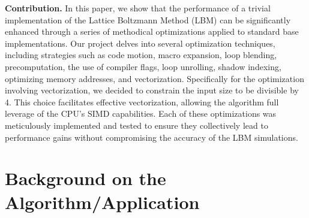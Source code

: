 \documentclass[letterpaper]{article}
\newcommand{\mypar}[1]{{\bf #1.}}
\begin{document}
\mypar{Contribution}
In this paper,  we show that the performance of a trivial implementation of the Lattice Boltzmann Method (LBM) can be significantly enhanced through a series of methodical optimizations applied to standard base implementations. Our project delves into several optimization techniques, including strategies such as code motion, macro expansion, loop blending, precomputation, the use of compiler flags, loop unrolling, shadow indexing, optimizing memory addresses, and vectorization. Specifically for the optimization involving vectorization, we decided to constrain the input size to be divisible by 4. This choice facilitates effective vectorization,  allowing the algorithm full leverage of the CPU's SIMD capabilities. Each of these optimizations was meticulously implemented and tested to ensure they collectively lead to performance gains without compromising the accuracy of the LBM simulations. 


\section{Background on the Algorithm/Application}\label{sec:background}
\end{document}
